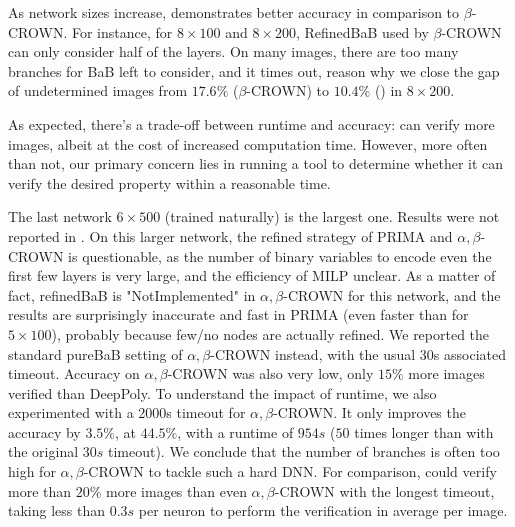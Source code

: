 As network sizes increase, \toolname demonstrates better accuracy in comparison to $\beta$-CROWN. For instance, for $8 \times 100$ and $8 \times 200$, 
RefinedBaB used by $\beta$-CROWN can only consider half of the layers. 
On many images, there are too many branches for BaB left to consider, and it times out,
reason why we close the gap of undetermined images from $17.6\%$ ($\beta$-CROWN) to $10.4\%$ (\toolname) in $8 \times 200$. 

As expected, there's a trade-off between runtime and accuracy: \toolname can verify more images, albeit at the cost of increased computation time. However, more often than not, our primary concern lies in running a tool to determine whether it can verify the desired property within a reasonable time.


The last network $6 \times 500$ (trained naturally) is the largest one. Results were not reported in \cite{crown,prima}. On this larger network, the refined strategy of PRIMA and $\alpha,\beta$-CROWN is questionable, as the number of binary variables to encode even the first few layers is very large, and the efficiency of MILP unclear. As a matter of fact, refinedBaB is "NotImplemented" in $\alpha,\beta$-CROWN for this network, and the results are 
surprisingly inaccurate and fast in PRIMA (even faster than for $5 \times 100$), probably because few/no nodes are actually refined. We reported the standard pureBaB setting of $\alpha,\beta$-CROWN instead, with the usual 30s associated timeout. Accuracy on $\alpha,\beta$-CROWN was also very low, only $15\%$ more images verified than DeepPoly. To understand the impact of runtime, we also experimented with a 2000s timeout for $\alpha,\beta$-CROWN. It only improves the accuracy by $3.5\%$, at $44.5\%$, with a runtime of $954s$ ($50$ times longer than with the original $30s$ timeout). We conclude that the number of branches is often too high for $\alpha,\beta$-CROWN to tackle such a hard DNN.
For comparison, \toolname could verify more than $20\%$ more images than
even $\alpha,\beta$-CROWN with the longest timeout, taking less than $0.3s$ per neuron to perform the verification in average per image.




